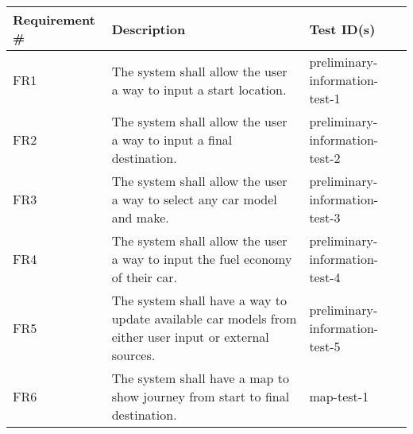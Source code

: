 \documentclass[12pt, titlepage]{article}
\begin{document}
  \begin{table}[!hbp]
	
	\begin{tabular}{|p{3.5cm}|p{6.5cm}|p{4.5cm}|}

	\hline
	\textbf{Requirement \#} & \textbf{Description}                                                                                                                                                                  & \textbf{Test ID(s)}                                                                                          \\ \hline
	FR1                     & The system shall allow the user a way to input a start location.                                                                                     & preliminary-information-test-1                                                                                                 \\ \hline
	FR2                     & The system shall allow the user a way to input a final destination.                                                                             & preliminary-information-test-2                                                                                               \\ \hline
	FR3                     & The system shall allow the user a way to select any car model and make.                                                                                                  & preliminary-information-test-3                                                                                         \\ \hline
	FR4                     & The system shall allow the user a way to input the fuel economy of their car.  & preliminary-information-test-4                                                                                         \\ \hline
	FR5                     & The system shall have a way to update available car models from either user input or external sources.                                                                                                         & preliminary-information-test-5                                                                                          \\ \hline
	FR6                     & The system shall have a map to show journey from start to final destination.                                                                                                                                  & map-test-1                                                                                          \\ \hline

\end{tabular}
\end{table}
\end{document}
